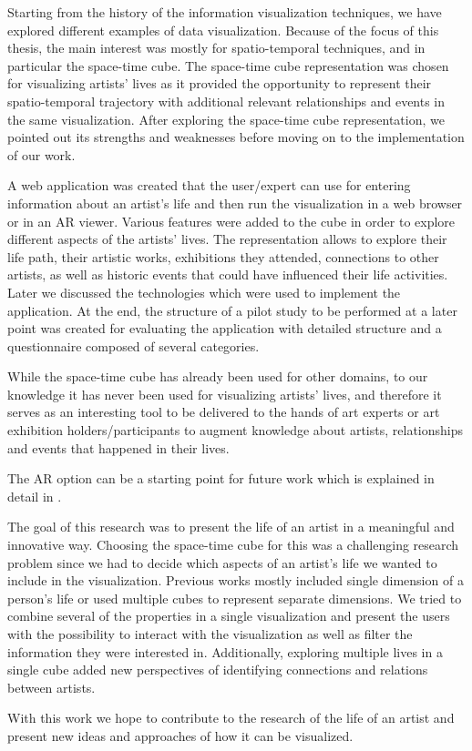 Starting from the history of the information visualization techniques, we have explored
different examples of data visualization. Because of the focus of this thesis, the main interest was mostly for spatio-temporal techniques, and in
particular the space-time cube. The space-time cube representation was chosen for visualizing artists' lives as it provided the opportunity to
represent their spatio-temporal trajectory with additional relevant relationships and events in the same visualization. After exploring the
space-time cube representation, we pointed out its strengths and weaknesses before moving on to the implementation of our work.

A web application was created that the user/expert can use for entering information about an artist's life and then run the visualization in a web
browser or in an AR viewer. Various features were added to the cube in order to explore different aspects of the artists' lives. The representation
allows to explore their life path, their artistic works, exhibitions they attended, connections to other artists, as well as historic events that
could have influenced their life activities. Later we discussed the technologies which were used to implement the application. At the end, the
structure of a pilot study to be performed at a later point was created for evaluating the application with detailed structure and a questionnaire
composed of several categories.

\clearpage

While the space-time cube has already been used for other domains, to our knowledge it has never been used for visualizing artists' lives, and
therefore it serves as an interesting tool to be delivered to the hands of art experts or art exhibition holders/participants to augment knowledge
about artists, relationships and events that happened in their lives.

The AR option can be a starting point for future work which is explained in detail in .

The goal of this research was to present the life of an artist in a meaningful and innovative way. Choosing the space-time cube for this was a
challenging research problem since we had to decide which aspects of an artist's life we wanted to include in the visualization. Previous works
mostly included single dimension of a person's life or used multiple cubes to represent separate dimensions. We tried to combine several of the
properties in a single visualization and present the users with the possibility to interact with the visualization as well as filter the information
they were interested in. Additionally, exploring multiple lives in a single cube added new perspectives of identifying connections and relations
between artists.

With this work we hope to contribute to the research of the life of an artist and present new ideas and approaches of how it can be visualized.


